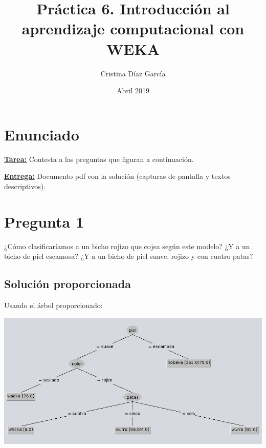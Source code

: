 \documentclass{article}
\title{Práctica 6. Introducción al aprendizaje computacional con WEKA}
\author{Cristina Díaz García}
\date{Abril 2019}
\begin{document}

\begin{titlingpage}
\maketitle
\end{titlingpage}

\newpage

\tableofcontents

\newpage

\section{Enunciado}

\textbf{\underline{Tarea:}} Contesta a las preguntas que figuran a continuación.

\textbf{\underline{Entrega:}} Documento pdf con la solución (capturas de pantalla y textos descriptivos).

\section{Pregunta 1}

¿Cómo clasificaríamos a un bicho rojizo que cojea según este modelo? ¿Y a un bicho de piel escamosa? ¿Y a un bicho de piel suave, rojizo y con cuatro patas?

\subsection{Solución proporcionada}

Usando el árbol proporcionado:

\begin{center}
\includegraphics[scale=0.5]{images/tree.png}
\end{center}
\end{document}

